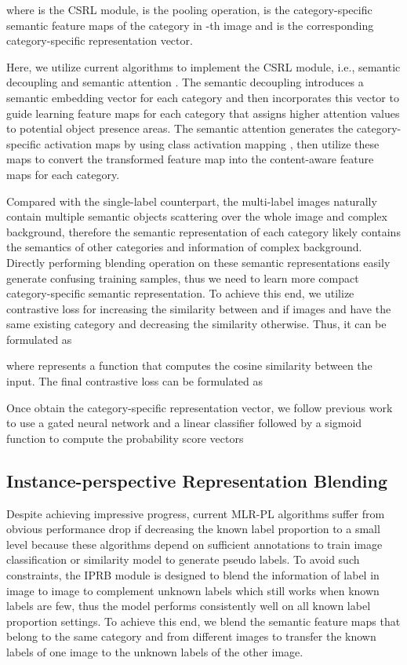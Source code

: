 \documentclass[lettersize,journal]{IEEEtran}
\begin{document}
where  is the CSRL module,  is the pooling operation,  is the category-specific semantic feature maps of the category  in -th image and  is the corresponding category-specific representation vector. 

Here, we utilize current algorithms to implement the CSRL module, i.e., semantic decoupling \cite{Chen2019SSGRL} and semantic attention \cite{Ye2020ADD-GCN}. The semantic decoupling \cite{Chen2019SSGRL} introduces a semantic embedding vector for each category and then incorporates this vector to guide learning feature maps for each category that assigns higher attention values to potential object presence areas. The semantic attention \cite{Ye2020ADD-GCN} generates the category-specific activation maps by using class activation mapping \cite{Zhou2016CAM}, then utilize these maps to convert the transformed feature map into the content-aware feature maps for each category.

Compared with the single-label counterpart, the multi-label images naturally contain multiple semantic objects scattering over the whole image and complex background, therefore the semantic representation of each category likely contains the semantics of other categories and information of complex background. Directly performing blending operation on these semantic representations easily generate confusing training samples, thus we need to learn more compact category-specific semantic representation. To achieve this end, we utilize contrastive loss for increasing the similarity between  and  if images  and  have the same existing category  and decreasing the similarity otherwise. Thus, it can be formulated as

where  represents a function that computes the cosine similarity between the input. The final contrastive loss can be formulated as 


Once obtain the category-specific representation vector, we follow previous work \cite{Chen2019SSGRL,Chen2022KGGR, Ye2020ADD-GCN, Chen2021Cross} to use a gated neural network and a linear classifier followed by a sigmoid function to compute the probability score vectors


\subsection{Instance-perspective Representation Blending}
Despite achieving impressive progress, current MLR-PL algorithms suffer from obvious performance drop if decreasing the known label proportion to a small level because these algorithms depend on sufficient annotations to train image classification or similarity model to generate pseudo labels. To avoid such constraints, the IPRB module is designed to blend the information of label  in image  to image  to complement unknown labels which still works when known labels are few, thus the model performs consistently well on all known label proportion settings. To achieve this end, we blend the semantic feature maps that belong to the same category and from different images to transfer the known labels of one image to the unknown labels of the other image.
\end{document}

